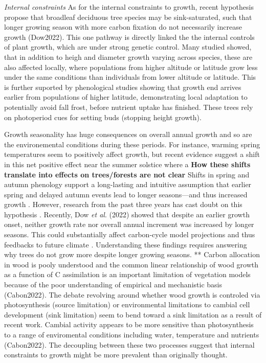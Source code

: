 \documentclass{article}
\begin{document}
\textit{Internal constraints}
As for the internal constraints to growth, recent hypothesis propose that broadleaf deciduous tree species may be sink-saturated, such that longer growing season with more carbon fixation do not necessarily increase growth (Dow2022). This one pathway is directly linked the the internal controls of plant growth, which are under strong genetic control. Many studied showed, that in addition to heigh and diameter growth varying across species, these are also affected locally, where populations from higher altitude or latitude grow less under the same conditions than individuals from lower altitude or latitude. This is further suported by phenological studies showing that growth end arrives earlier from populations of higher latitude, demonstrating local adaptation to potentially avoid fall frost, before nutrient uptake has finished. These trees rely on photoperiod cues for setting buds (stopping height growth). 

Growth seasonality has huge consequences on overall annual growth and so are the environemental conditions during these periods. For instance, warming spring temperatures seem to positively affect growth, but recent evidence suggest a shift in this net positive effect near the summer solstice where a
\textbf{How these shifts translate into effects on trees/forests are not clear}
Shifts in spring and autumn phenology support a long-lasting and intuitive assumption that earlier spring and delayed autumn events lead to longer seasons---and thus increased growth \cite{keenan_net_2014}. However, research from the past three years has cast doubt on this hypothesis \cite{dow_warm_2022,green_limits_2022,silvestro_longer_2023}. Recently, Dow \textit{et al}. (2022) showed that despite an earlier growth onset, neither growth rate nor overall annual increment was increased by longer seasons. This could substantially affect carbon-cycle model projections and thus feedbacks to future climate \cite{richardson_climate_2013,swidrak_comparing_2013}. 
Understanding these findings requires answering why trees do not grow more despite longer growing seasons. ** Carbon allocation in wood is pooly understood and the common linear relationship of wood growth as a function of C assimilation is an important limitation of vegetation models because of the poor understanding of empirical and mechanistic basis (Cabon2022). The debate revolving around whether wood growth is controled via photosynthesis (source limitation) or environmental limitations to cambial cell development (sink limitation) seem to bend toward a sink limitation as a result of recent work. Cambial activity appears to be more sensitive than photosynthesis to a range of enviromental conditions including water, temperature and nutrients (Cabon2022). The decoupling between these two processes suggest that internal constraints to growth might be more prevalent than originally thought.
\end{document}
